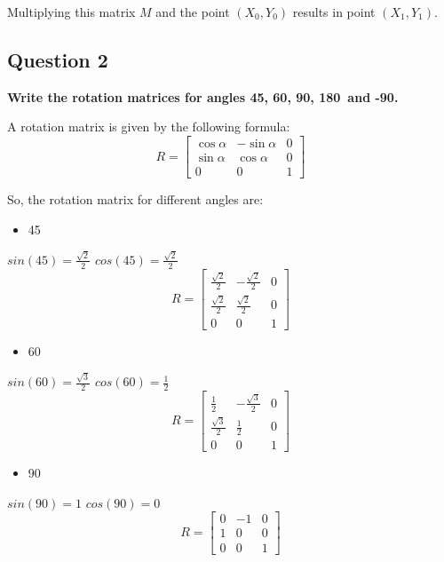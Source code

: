 \documentclass[12pt]{article}
\begin{document}
Multiplying this matrix $M$ and the point $(X_0, Y_0)$ results in point $(X_1, Y_1)$.

\subsection*{Question 2}
{\bfseries Write the rotation matrices for angles 45\degree, 60\degree, 90\degree, 180\degree~and -90\degree.}

A rotation matrix is given by the following formula:
\begin{equation*}
    R=
    \begin{bmatrix}
    \cos{\alpha} & -\sin{\alpha} & 0 \\
    \sin{\alpha} & \cos{\alpha} & 0 \\
    0 & 0 & 1
    \end{bmatrix}
\end{equation*}

So, the rotation matrix for different angles are:
\begin{itemize}
    \item 45\degree
\end{itemize}
$sin(45) = \frac{\sqrt{2}}{2}$ \hspace{1cm} $cos(45) = \frac{\sqrt{2}}{2}$
\begin{equation*}
    \renewcommand\arraystretch{2}
    R=
    \begin{bmatrix}
    \frac{\sqrt{2}}{2} & -\frac{\sqrt{2}}{2} & 0 \\
    \frac{\sqrt{2}}{2} & \frac{\sqrt{2}}{2} & 0 \\
    0 & 0 & 1
    \end{bmatrix}
\end{equation*}

\begin{itemize}
    \item 60\degree
\end{itemize}
$sin(60) = \frac{\sqrt{3}}{2}$ \hspace{1cm} $cos(60) = \frac{1}{2}$
\begin{equation*}
    \renewcommand\arraystretch{2}
    R=
    \begin{bmatrix}
    \frac{1}{2} & -\frac{\sqrt{3}}{2} & 0 \\
    \frac{\sqrt{3}}{2} & \frac{1}{2} & 0 \\
    0 & 0 & 1
    \end{bmatrix}
\end{equation*}

\begin{itemize}
    \item 90\degree
\end{itemize}
$sin(90) = 1$ \hspace{1cm} $cos(90) = 0$
\begin{equation*}
    R=
    \begin{bmatrix}
    0 & -1 & 0 \\
    1 & 0 & 0 \\
    0 & 0 & 1
    \end{bmatrix}
\end{equation*}
\end{document}
